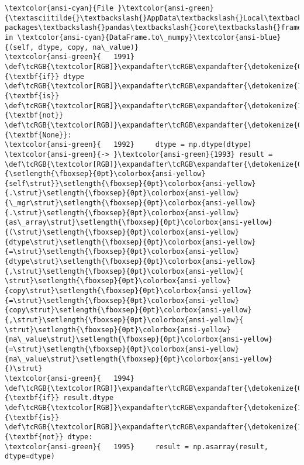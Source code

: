 \documentclass[11pt]{article}
\begin{document}
\begin{Verbatim}[commandchars=\\\{\}, frame=single, framerule=2mm, rulecolor=\color{outerrorbackground}]
\textcolor{ansi-cyan}{File }\textcolor{ansi-green}{\textasciitilde{}\textbackslash{}AppData\textbackslash{}Local\textbackslash{}Programs\textbackslash{}Python\textbackslash{}Python313\textbackslash{}Lib\textbackslash{}site-packages\textbackslash{}pandas\textbackslash{}core\textbackslash{}frame.py:1993}, in \textcolor{ansi-cyan}{DataFrame.to\_numpy}\textcolor{ansi-blue}{(self, dtype, copy, na\_value)}
\textcolor{ansi-green}{   1991} \def\tcRGB{\textcolor[RGB]}\expandafter\tcRGB\expandafter{\detokenize{0,135,0}}{\textbf{if}} dtype \def\tcRGB{\textcolor[RGB]}\expandafter\tcRGB\expandafter{\detokenize{175,0,255}}{\textbf{is}} \def\tcRGB{\textcolor[RGB]}\expandafter\tcRGB\expandafter{\detokenize{175,0,255}}{\textbf{not}} \def\tcRGB{\textcolor[RGB]}\expandafter\tcRGB\expandafter{\detokenize{0,135,0}}{\textbf{None}}:
\textcolor{ansi-green}{   1992}     dtype = np.dtype(dtype)
\textcolor{ansi-green}{-> }\textcolor{ansi-green}{1993} result = \def\tcRGB{\textcolor[RGB]}\expandafter\tcRGB\expandafter{\detokenize{0,135,0}}{\setlength{\fboxsep}{0pt}\colorbox{ansi-yellow}{self\strut}}\setlength{\fboxsep}{0pt}\colorbox{ansi-yellow}{.\strut}\setlength{\fboxsep}{0pt}\colorbox{ansi-yellow}{\_mgr\strut}\setlength{\fboxsep}{0pt}\colorbox{ansi-yellow}{.\strut}\setlength{\fboxsep}{0pt}\colorbox{ansi-yellow}{as\_array\strut}\setlength{\fboxsep}{0pt}\colorbox{ansi-yellow}{(\strut}\setlength{\fboxsep}{0pt}\colorbox{ansi-yellow}{dtype\strut}\setlength{\fboxsep}{0pt}\colorbox{ansi-yellow}{=\strut}\setlength{\fboxsep}{0pt}\colorbox{ansi-yellow}{dtype\strut}\setlength{\fboxsep}{0pt}\colorbox{ansi-yellow}{,\strut}\setlength{\fboxsep}{0pt}\colorbox{ansi-yellow}{ \strut}\setlength{\fboxsep}{0pt}\colorbox{ansi-yellow}{copy\strut}\setlength{\fboxsep}{0pt}\colorbox{ansi-yellow}{=\strut}\setlength{\fboxsep}{0pt}\colorbox{ansi-yellow}{copy\strut}\setlength{\fboxsep}{0pt}\colorbox{ansi-yellow}{,\strut}\setlength{\fboxsep}{0pt}\colorbox{ansi-yellow}{ \strut}\setlength{\fboxsep}{0pt}\colorbox{ansi-yellow}{na\_value\strut}\setlength{\fboxsep}{0pt}\colorbox{ansi-yellow}{=\strut}\setlength{\fboxsep}{0pt}\colorbox{ansi-yellow}{na\_value\strut}\setlength{\fboxsep}{0pt}\colorbox{ansi-yellow}{)\strut}
\textcolor{ansi-green}{   1994} \def\tcRGB{\textcolor[RGB]}\expandafter\tcRGB\expandafter{\detokenize{0,135,0}}{\textbf{if}} result.dtype \def\tcRGB{\textcolor[RGB]}\expandafter\tcRGB\expandafter{\detokenize{175,0,255}}{\textbf{is}} \def\tcRGB{\textcolor[RGB]}\expandafter\tcRGB\expandafter{\detokenize{175,0,255}}{\textbf{not}} dtype:
\textcolor{ansi-green}{   1995}     result = np.asarray(result, dtype=dtype)


\end{Verbatim}
\end{document}
